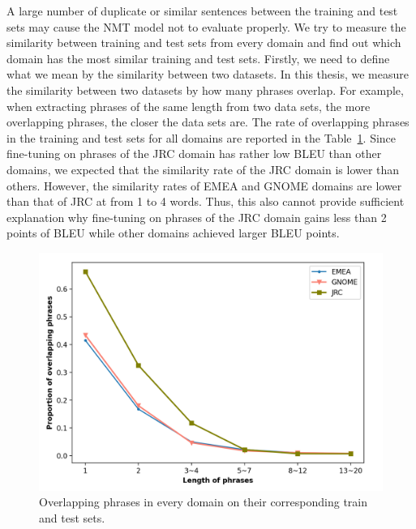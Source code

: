 A large number of duplicate or similar sentences between the training and test sets may cause the NMT model not to evaluate properly. %
We try to measure the similarity between training and test sets from every domain and find out which domain has the most similar training and test sets. 
Firstly, we need to define what we mean by the similarity between two datasets. In this thesis, we measure the similarity between two datasets by how many phrases overlap. 
For example, when extracting phrases of the same length from two data sets, the more overlapping phrases, the closer the data sets are. 
The rate of overlapping phrases in the training and test sets for all domains are reported in the Table~\ref{fig:overlapping_phrases}. Since fine-tuning on phrases of the JRC domain has rather low BLEU than other domains, we expected that the similarity rate of the JRC domain is lower than others. 
However, the similarity rates of EMEA and GNOME domains are lower than that of JRC at from 1 to 4 words. Thus, this also cannot provide sufficient explanation why fine-tuning on phrases of the JRC domain gains less than 2 points of BLEU while other domains achieved larger BLEU points. 

\begin{figure}[hb]
    \centering
    \includegraphics[scale=0.45]{images/overlapping_phrases_all.png}
    \caption{Overlapping phrases in every domain on their corresponding train and test sets.}
    \label{fig:overlapping_phrases}
\end{figure}

